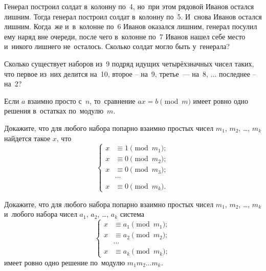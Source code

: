 


\begin{problems}

\item
Генерал построил солдат в~колонну по~4, но~при этом рядовой Иванов остался
лишним.
Тогда генерал построил солдат в~колонну по~5.
И~снова Иванов остался лишним.
Когда~же и~в~колонне по~6 Иванов оказался лишним, генерал посулил ему наряд вне
очереди, после чего в~колонне по~7 Иванов нашел себе место и~никого лишнего
не~осталось.
Сколько солдат могло быть у~генерала?

\item
Сколько существует наборов из~9 подряд идущих четырёхзначных чисел таких, что
первое из~них делится на~10, второе -- на~9, третье~--- на~8, ...
последнее -- на~2?

\item
Если $a$ взаимно просто с~$n$, то~сравнение $ax=b\pmod m$ имеет ровно одно
решения в~остатках по~модулю~$m$.

\item
Докажите, что для любого набора попарно взаимно простых чисел
$m_{1}$, $m_{2}$, \ldots, $m_{k}$ найдется такое $x$, что
\[
\left\{ \begin{aligned}
    x & \equiv 1 \pmod{m_{1}}
; \\
    x & \equiv 0 \pmod{m_{2}}
; \\
    x & \equiv 0 \pmod{m_{3}}
; \\ & \cdots \\
    x & \equiv 0 \pmod{m_{k}}
. \end{aligned} \right.
\]

\item
Докажите, что для любого набора попарно взаимно простых чисел
$m_{1}$, $m_{2}$, \ldots, $m_{k}$ и~любого набора чисел
$a_{1}$, $a_{2}$, \ldots, $a_{k}$ система
\[
\left\{ \begin{aligned}
    x & \equiv a_{1} \pmod{m_{1}}
; \\
    x & \equiv a_{2} \pmod{m_{2}}
; \\ & \cdots \\
    x & \equiv a_{k} \pmod{m_{k}}
; \end{aligned} \right.
\]
имеет ровно одно решение по~модулю $m_{1} m_{2} \ldots m_{k}$.


\end{problems}

